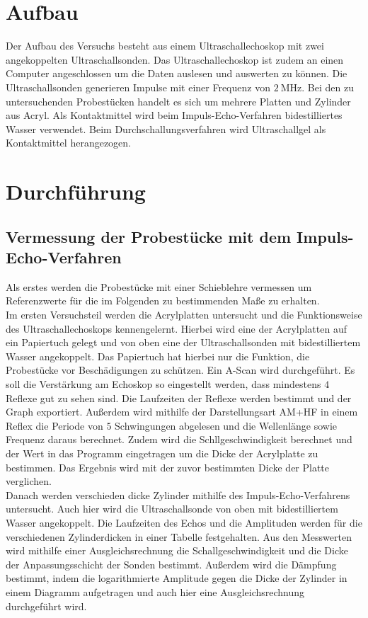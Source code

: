 \section{Aufbau}
\label{sec:Aufbau}
Der Aufbau des Versuchs besteht aus einem Ultraschallechoskop mit zwei angekoppelten Ultraschallsonden. Das Ultraschallechoskop
ist zudem an einen Computer angeschlossen um die Daten auslesen und auswerten zu können.
Die Ultraschallsonden generieren Impulse mit einer Frequenz von $\qty{2}{\mega\hertz}$.
Bei den zu untersuchenden Probestücken handelt es sich um mehrere Platten und Zylinder aus Acryl.
Als Kontaktmittel wird beim Impuls-Echo-Verfahren bidestilliertes Wasser verwendet. Beim Durchschallungsverfahren wird
Ultraschallgel als Kontaktmittel herangezogen.


\section{Durchführung}
\label{sec:Durchführung}
\subsection{Vermessung der Probestücke mit dem Impuls-Echo-Verfahren}
\label{sub:ImpEch_durch}
Als erstes werden die Probestücke mit einer Schieblehre vermessen um Referenzwerte für die im Folgenden zu bestimmenden Maße zu erhalten.\\

Im ersten Versuchsteil werden die Acrylplatten untersucht und die Funktionsweise des Ultraschallechoskops kennengelernt.
Hierbei wird eine der Acrylplatten auf ein Papiertuch gelegt und von oben eine der Ultraschallsonden mit bidestilliertem Wasser angekoppelt.
Das Papiertuch hat hierbei nur die Funktion, die Probestücke vor Beschädigungen zu schützen.
Ein A-Scan wird durchgeführt. Es soll die Verstärkung am Echoskop so eingestellt werden, dass mindestens $4$ Reflexe gut zu sehen sind.
Die Laufzeiten der Reflexe werden bestimmt und der Graph exportiert.
Außerdem wird mithilfe der Darstellungsart AM+HF in einem Reflex die Periode von $5$ Schwingungen abgelesen 
und die Wellenlänge sowie Frequenz daraus berechnet.
Zudem wird die Schllgeschwindigkeit berechnet und der Wert in das Programm eingetragen um die Dicke der Acrylplatte zu bestimmen.
Das Ergebnis wird mit der zuvor bestimmten Dicke der Platte verglichen.\\

Danach werden verschieden dicke Zylinder mithilfe des Impuls-Echo-Verfahrens untersucht.
Auch hier wird die Ultraschallsonde von oben mit bidestilliertem Wasser angekoppelt.
Die Laufzeiten des Echos und die Amplituden werden für die verschiedenen Zylinderdicken in einer Tabelle festgehalten.
Aus den Messwerten wird mithilfe einer Ausgleichsrechnung die Schallgeschwindigkeit und die Dicke der Anpassungsschicht
der Sonden bestimmt.
Außerdem wird die Dämpfung bestimmt, indem die logarithmierte Amplitude gegen die Dicke der Zylinder in einem Diagramm aufgetragen und 
auch hier eine Ausgleichsrechnung durchgeführt wird.

